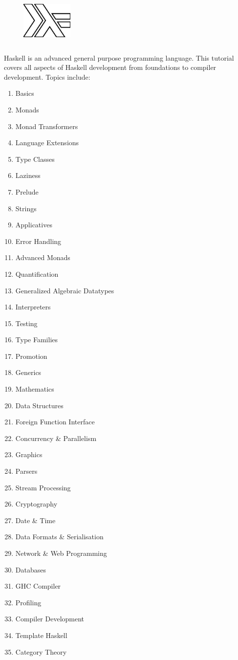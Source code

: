 \pagestyle{empty}

\begin{figure}
    \centering
    \includegraphics[height=1in,width=1in]{img/cover.ps}
\end{figure}

\Large
Haskell is an advanced general purpose programming language. This tutorial
covers all aspects of Haskell development from foundations to compiler
development. Topics include:

\small
\begin{enumerate}
\item Basics
\item Monads
\item Monad Transformers
\item Language Extensions
\item Type Classes
\item Laziness
\item Prelude
\item Strings
\item Applicatives
\item Error Handling
\item Advanced Monads
\item Quantification
\item Generalized Algebraic Datatypes
\item Interpreters
\item Testing
\item Type Families
\item Promotion
\item Generics
\item Mathematics
\item Data Structures
\item Foreign Function Interface
\item Concurrency \& Parallelism
\item Graphics
\item Parsers
\item Stream Processing
\item Cryptography
\item Date \& Time
\item Data Formats \& Serialisation
\item Network \& Web Programming
\item Databases
\item GHC Compiler
\item Profiling
\item Compiler Development
\item Template Haskell
\item Category Theory
\end{enumerate}

